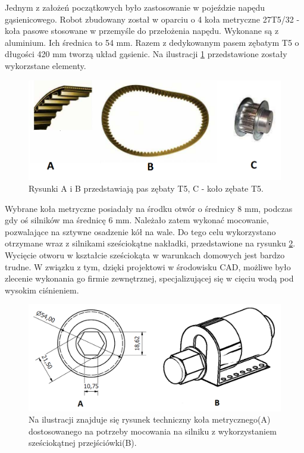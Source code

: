 Jednym z założeń początkowych było zastosowanie w pojeździe napędu gąsienicowego. Robot zbudowany został w oparciu o 4 koła metryczne 27T5/32 - koła pasowe stosowane w przemyśle do przełożenia napędu. Wykonane są z aluminium. Ich średnica to 54 mm. Razem z dedykowanym pasem zębatym T5 o długości 420 mm tworzą układ gąsienic. Na ilustracji \ref{gasienice_elementy} przedstawione zostały wykorzstane elementy.

  \begin{figure}[H]
    \begin{center}
      \includegraphics[scale=0.5]{imgs/gasienice.png}
 	\caption[Elementy gąsienic.]{\small{Rysunki A i B przedstawiają pas zębaty T5, C - koło zębate T5. }\footnotemark}
	\label{gasienice_elementy}
    \end{center}
  \end{figure}

Wybrane koła metryczne posiadały na środku otwór o średnicy 8 mm, podczas gdy oś silników ma średnicę 6 mm. Należało zatem wykonać mocowanie, pozwalające na sztywne osadzenie kół na wale. Do tego celu wykorzystano otrzymane wraz z silnikami sześciokątne nakładki, przedstawione na rysunku \ref{zamocowanie_szesciokatne}. Wycięcie otworu w kształcie sześciokąta w warunkach domowych jest bardzo trudne. W związku z tym, dzięki projektowi w środowisku CAD, możliwe było zlecenie wykonania go firmie zewnętrznej, specjalizującej się w cięciu wodą pod wysokim ciśnieniem.

  \begin{figure}[H]
    \begin{center}
      \includegraphics[scale=0.40]{imgs/moc_kol_tyl.png}
 	\caption[Model tylnych kół.]{\small{Na ilustracji znajduje się rysunek techniczny koła metrycznego(A) dostosowanego na potrzeby mocowania na silniku z wykorzystaniem sześciokątnej przejściówki(B).}}
	\label{zamocowanie_szesciokatne}
    \end{center}
  \end{figure}

